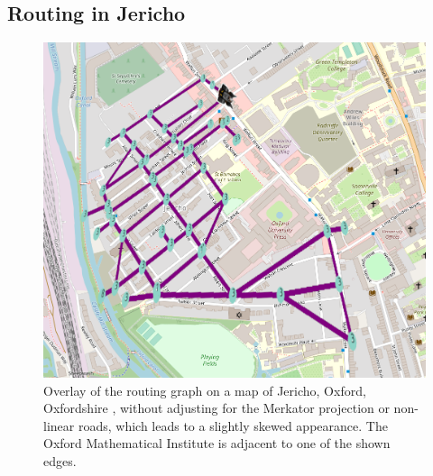 \documentclass{prettytex/ox/mmsc-special-topic}
\begin{document}
  \subsection{Routing in Jericho}

  \begin{figure}[H]
    \centering
    \includegraphics[width=0.5\linewidth]{figures/jericho.png}
    \caption{Overlay of the routing graph on a map of Jericho, Oxford, Oxfordshire \parencite{osm}, without adjusting for the Merkator projection or non-linear roads, which leads to a slightly skewed appearance. The Oxford Mathematical Institute is adjacent to one of the shown edges.}
  \end{figure}
\end{document}
